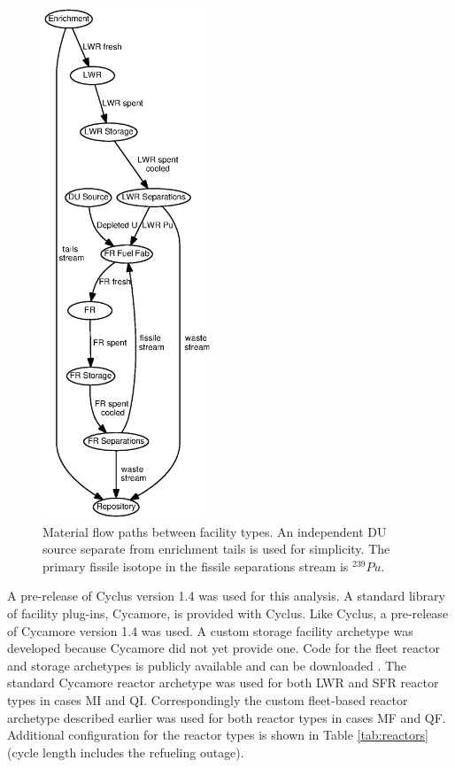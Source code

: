 \documentclass{style}
\begin{document}
\begin{figure}[!h]
    \centering
    \includegraphics[keepaspectratio=true,width=0.45\textwidth,height=.89\textheight]{exp2/flow.eps}
    \caption[Material flow paths]{
        Material flow paths between facility types. An independent DU source separate
        from enrichment tails is used for simplicity.  The primary fissile isotope in
        the fissile separations stream is $^{239}Pu$.
    }
    \label{fig:flow}
\end{figure}

A pre-release of Cyclus version 1.4 was used for this analysis.  A standard library of facility plug-ins, Cycamore, is provided with Cyclus.
Like Cyclus, a pre-release of Cycamore version 1.4 was used.  A custom storage facility archetype was
developed because Cycamore did not yet provide one.  Code for the fleet reactor and
storage archetypes is publicly available and can be downloaded \cite{Carlsen2015}. The standard Cycamore reactor archetype
was used for both LWR and SFR reactor types in cases MI and QI.  Correspondingly
the custom fleet-based reactor archetype described earlier was used for both reactor
types in cases MF and QF.  Additional configuration for the reactor types is
shown in Table \ref{tab:reactors} (cycle length includes the refueling outage).
\end{document}
